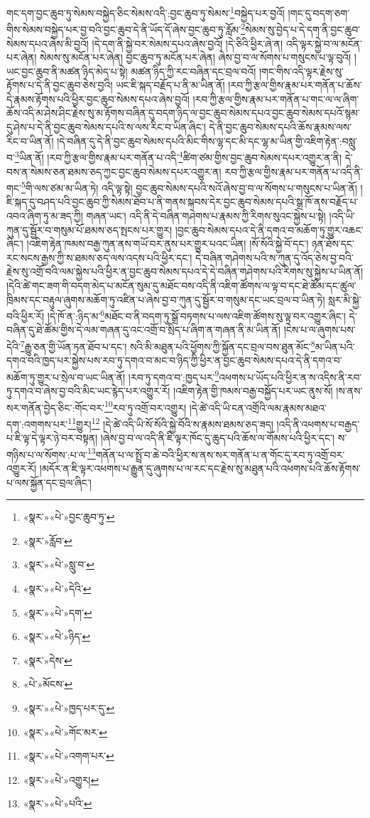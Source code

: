 གང་དག་བྱང་ཆུབ་ཏུ་སེམས་བསྐྱེད་ཅིང་སེམས་འདི་:བྱང་ཆུབ་ཏུ་སེམས་\footnote{«སྣར་»«པེ་»བྱང་ཆུབ་ཏུ་}བསྐྱེད་པར་བྱའོ། །གང་དུ་བདག་ཅག་གིས་སེམས་བསྐྱེད་པར་བྱ་བའི་བྱང་ཆུབ་དེ་ནི་ཡོད་དོ་ཞེས་བྱང་ཆུབ་ཏུ་རློམ་\footnote{«སྣར་»རློབ་}སེམས་སུ་བྱེད་པ་དེ་དག་ནི་བྱང་ཆུབ་སེམས་དཔའ་ཞེས་མི་བྱའོ། །དེ་དག་ནི་སྐྱེ་བར་སེམས་དཔའ་ཞེས་བྱའོ། །དེ་ཅིའི་ཕྱིར་ཞེ་ན། འདི་ལྟར་སྐྱེ་བ་ལ་མངོན་པར་ཞེན། སེམས་སུ་མངོན་པར་ཞེན། བྱང་ཆུབ་ཏུ་མངོན་པར་ཞེན། ཞེས་བྱ་བ་ལ་སོགས་པ་གསུངས་པ་ལྟ་བུའོ། །ཡང་བྱང་ཆུབ་ནི་མཚན་ཉིད་མེད་པ་སྟེ། མཚན་ཉིད་ཀྱི་རང་བཞིན་དང་བྲལ་བའོ། །གང་གིས་འདི་ལྟར་རྗེས་སུ་རྟོགས་པ་དེ་ནི་བྱང་ཆུབ་ཅེས་བྱའི། ཡང་ཇི་སྐད་བརྗོད་པ་ནི་མ་ཡིན་ནོ། །རབ་ཀྱི་རྩལ་གྱིས་རྣམ་པར་གནོན་པ་ཆོས་དེ་རྣམས་རྟོགས་པའི་ཕྱིར་བྱང་ཆུབ་སེམས་དཔའ་ཞེས་བྱའོ། །རབ་ཀྱི་རྩལ་གྱིས་རྣམ་པར་གནོན་པ་གང་ལ་ལ་ཞིག་ཆོས་འདི་མ་ཤེས་ཤིང་རྗེས་སུ་མ་རྟོགས་བཞིན་དུ་བདག་ཉིད་ལ་བྱང་ཆུབ་སེམས་དཔའ་བྱང་ཆུབ་སེམས་དཔའོ་སྙམ་དུ་ཤེས་པ་དེ་ནི་བྱང་ཆུབ་སེམས་དཔའི་ས་ལས་རིང་བ་ཡིན་ཞིང་། དེ་ནི་བྱང་ཆུབ་སེམས་དཔའི་ཆོས་རྣམས་ལས་རིང་བ་ཡིན་ནོ། །དེ་བཞིན་དུ་དེ་ནི་བྱང་ཆུབ་སེམས་དཔའི་མིང་གིས་ལྷ་དང་མི་དང་ལྷ་མ་ཡིན་གྱི་འཇིག་རྟེན་:བསླུ་བ་\footnote{«སྣར་»«པེ་»སླུ་བ་}ཡིན་ནོ། །རབ་ཀྱི་རྩལ་གྱིས་རྣམ་པར་གནོན་པ་འདི་\footnote{«སྣར་»«པེ་»དེའི་}ཚིག་ཙམ་གྱིས་བྱང་ཆུབ་སེམས་དཔར་འགྱུར་ན་ནི། དེ་བས་ན་སེམས་ཅན་ཐམས་ཅད་ཀྱང་བྱང་ཆུབ་སེམས་དཔར་འགྱུར་ན། རབ་ཀྱི་རྩལ་གྱིས་རྣམ་པར་གནོན་པ་འདི་ནི་གང་\footnote{«སྣར་»«པེ་»དག་}གི་ལས་ཙམ་མ་ཡིན་ཏེ། འདི་ལྟ་སྟེ། བྱང་ཆུབ་སེམས་དཔའི་སའོ་ཞེས་བྱ་བ་ལ་སོགས་པ་གསུངས་པ་ཡིན་ནོ། །ཇི་སྐད་དུ་བཤད་པའི་བྱང་ཆུབ་ཀྱི་སེམས་ཐོབ་པ་ནི་གནས་སྐབས་དེར་བྱང་ཆུབ་སེམས་དཔའི་སྒྲ་ཁོ་ནས་བརྗོད་པ་འབའ་ཞིག་ཏུ་མ་ཟད་ཀྱི། གཞན་ཡང་། འདི་ནི་དེ་བཞིན་གཤེགས་པ་རྣམས་ཀྱི་རིགས་སུའང་སྐྱེས་པ་སྟེ། །འདི་ཡི་ཀུན་དུ་སྦྱོར་བ་གསུམ་པོ་ཐམས་ཅད་སྤངས་པར་གྱུར། །བྱང་ཆུབ་སེམས་དཔའ་དེ་ནི་དགའ་བ་མཆོག་ཏུ་གྱུར་འཆང་ཞིང་། །འཇིག་རྟེན་ཁམས་བརྒྱ་ཀུན་ནས་གཡོ་བར་ནུས་པར་གྱུར་པའང་ཡིན། །སོ་སོའི་སྐྱེ་བོ་དང་། ཉན་ཐོས་དང་རང་སངས་རྒྱས་ཀྱི་ས་ཐམས་ཅད་ལས་འདས་པའི་ཕྱིར་དང་། དེ་བཞིན་གཤེགས་པའི་ས་ཀུན་དུ་འོད་ཅེས་བྱ་བའི་རྗེས་སུ་འགྲོ་བའི་ལམ་སྐྱེས་པའི་ཕྱིར་ན་བྱང་ཆུབ་སེམས་དཔའ་དེ་དེ་བཞིན་གཤེགས་པའི་རིགས་སུ་སྐྱེས་པ་ཡིན་ནོ། །དེའི་ཚེ་གང་ཟག་གི་བདག་མེད་པ་མངོན་སུམ་དུ་མཐོང་བས་འདི་ནི་འཇིག་ཚོགས་ལ་ལྟ་བ་དང་ཐེ་ཚོམ་དང་ཚུལ་ཁྲིམས་དང་བརྟུལ་ཞུགས་མཆོག་ཏུ་འཛིན་པ་ཞེས་བྱ་བ་ཀུན་དུ་སྦྱོར་བ་གསུམ་དང་ཡང་བྲལ་བ་ཡིན་ཏེ། སླར་མི་སྐྱེ་བའི་ཕྱིར་རོ། །དེ་ཁོ་ན་:ཉིད་མ་\footnote{«སྣར་»«པེ་»ཉིད་}མཐོང་བ་ནི་བདག་ཏུ་སྒྲོ་བཏགས་པ་ལས་འཇིག་ཚོགས་སུ་ལྟ་བར་འགྱུར་ཞིང་། དེ་བཞིན་དུ་ཐེ་ཚོམ་གྱིས་དེ་ལམ་གཞན་དུ་འང་འགྲོ་བ་སྲིད་པ་ཞིག་ན་གཞན་ནི་མ་ཡིན་ནོ། །ངེས་པ་ལ་ཞུགས་པས་དེའི་\footnote{«སྣར་»དེས་}རྒྱུ་ཅན་གྱི་ཡོན་ཏན་ཐོབ་པ་དང་། སའི་མི་མཐུན་པའི་ཕྱོགས་ཀྱི་སྐྱོན་དང་བྲལ་བས་ཐུན་མོང་\footnote{«པེ་»མོངས་}མ་ཡིན་པའི་དགའ་བའི་ཁྱད་པར་སྐྱེས་པས་རབ་ཏུ་དགའ་བ་མང་བ་ཉིད་ཀྱི་ཕྱིར་ན་བྱང་ཆུབ་སེམས་དཔའ་དེ་ནི་དགའ་བ་མཆོག་ཏུ་གྱུར་པ་སྲེལ་བ་ཡང་ཡིན་ནོ། །རབ་ཏུ་དགའ་བ་:ཁྱད་པར་\footnote{«སྣར་»«པེ་»ཁྱད་པར་དུ་}འཕགས་པ་ཡོད་པའི་ཕྱིར་ན་ས་འདིས་ནི་རབ་ཏུ་དགའ་བ་ཞེས་བྱ་བའི་མིང་ཡང་རྙེད་པར་འགྱུར་རོ། །འཇིག་རྟེན་གྱི་ཁམས་བརྒྱ་བསྐྱོད་པར་ཡང་ནུས་སོ། །ས་ནས་སར་གནོན་བྱེད་ཅིང་:གོང་བར་\footnote{«སྣར་»«པེ་»གོང་མར་}རབ་ཏུ་འགྲོ་བར་འགྱུར། །དེ་ཚེ་འདི་ཡི་ངན་འགྲོའི་ལམ་རྣམས་མཐའ་དག་:འགགས་པར་\footnote{«སྣར་»«པེ་»འགག་པར་}གྱུར།\footnote{«སྣར་»«པེ་»འགྱུར།} །དེ་ཚེ་འདི་ཡི་སོ་སོའི་སྐྱེ་བོའི་ས་རྣམས་ཐམས་ཅད་ཟད། །འདི་ནི་འཕགས་པ་བརྒྱད་པ་ཇི་ལྟ་དེ་ལྟར་ཉེ་བར་བསྟན། །ཞེས་བྱ་བ་ལ་འདི་ནི་ཇི་ལྟར་ཁོང་དུ་ཆུད་པའི་ཆོས་ལ་གོམས་པའི་ཕྱིར་དང་། ས་གཉིས་པ་ལ་སོགས་:པ་ལ་\footnote{«སྣར་»«པེ་»པའི་}གནོན་པ་ལ་སྤྲོ་བ་ཆེ་བའི་ཕྱིར་ས་ནས་སར་གནོན་པ་ན་གོང་དུ་རབ་ཏུ་འགྲོ་བར་འགྱུར་རོ། །མདོར་ན་ཇི་ལྟར་འཕགས་པ་རྒྱུན་དུ་ཞུགས་པ་ལ་རང་དང་རྗེས་སུ་མཐུན་པའི་འཕགས་པའི་ཆོས་རྟོགས་པ་ལས་སྐྱོན་དང་བྲལ་ཞིང་། 